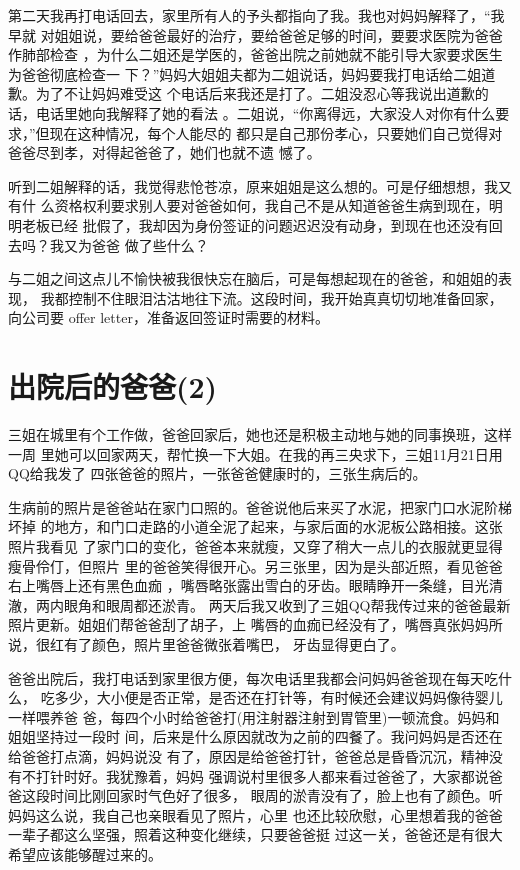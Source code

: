 \documentclass[12pt]{book}
\begin{document}
第二天我再打电话回去，家里所有人的予头都指向了我。我也对妈妈解释了，“我早就
对姐姐说，要给爸爸最好的治疗，要给爸爸足够的时间，要要求医院为爸爸作肺部检查
，为什么二姐还是学医的，爸爸出院之前她就不能引导大家要求医生为爸爸彻底检查一
下？”妈妈大姐姐夫都为二姐说话，妈妈要我打电话给二姐道歉。为了不让妈妈难受这
个电话后来我还是打了。二姐没忍心等我说出道歉的话，电话里她向我解释了她的看法
。二姐说，“你离得远，大家没人对你有什么要求，”但现在这种情况，每个人能尽的
都只是自己那份孝心，只要她们自己觉得对爸爸尽到孝，对得起爸爸了，她们也就不遗
憾了。

听到二姐解释的话，我觉得悲怆苍凉，原来姐姐是这么想的。可是仔细想想，我又有什
么资格权利要求别人要对爸爸如何，我自己不是从知道爸爸生病到现在，明明老板已经
批假了，我却因为身份签证的问题迟迟没有动身，到现在也还没有回去吗？我又为爸爸
做了些什么？

与二姐之间这点儿不愉快被我很快忘在脑后，可是每想起现在的爸爸，和姐姐的表现，
我都控制不住眼泪沽沽地往下流。这段时间，我开始真真切切地准备回家，向公司要
offer letter，准备返回签证时需要的材料。
\section{出院后的爸爸(2)}
\label{sec-9-15}

三姐在城里有个工作做，爸爸回家后，她也还是积极主动地与她的同事换班，这样一周
里她可以回家两天，帮忙换一下大姐。在我的再三央求下，三姐11月21日用QQ给我发了
四张爸爸的照片，一张爸爸健康时的，三张生病后的。

生病前的照片是爸爸站在家门口照的。爸爸说他后来买了水泥，把家门口水泥阶梯坏掉
的地方，和门口走路的小道全泥了起来，与家后面的水泥板公路相接。这张照片我看见
了家门口的变化，爸爸本来就瘦，又穿了稍大一点儿的衣服就更显得瘦骨伶仃，但照片
里的爸爸笑得很开心。另三张里，因为是头部近照，看见爸爸右上嘴唇上还有黑色血痂
，嘴唇略张露出雪白的牙齿。眼睛睁开一条缝，目光清澈，两内眼角和眼周都还淤青。
两天后我又收到了三姐QQ帮我传过来的爸爸最新照片更新。姐姐们帮爸爸刮了胡子，上
嘴唇的血痂已经没有了，嘴唇真张妈妈所说，很红有了颜色，照片里爸爸微张着嘴巴，
牙齿显得更白了。

爸爸出院后，我打电话到家里很方便，每次电话里我都会问妈妈爸爸现在每天吃什么，
吃多少，大小便是否正常，是否还在打针等，有时候还会建议妈妈像待婴儿一样喂养爸
爸，每四个小时给爸爸打(用注射器注射到胃管里)一顿流食。妈妈和姐姐坚持过一段时
间，后来是什么原因就改为之前的四餐了。我问妈妈是否还在给爸爸打点滴，妈妈说没
有了，原因是给爸爸打针，爸爸总是昏昏沉沉，精神没有不打针时好。我犹豫着，妈妈
强调说村里很多人都来看过爸爸了，大家都说爸爸这段时间比刚回家时气色好了很多，
眼周的淤青没有了，脸上也有了颜色。听妈妈这么说，我自己也亲眼看见了照片，心里
也还比较欣慰，心里想着我的爸爸一辈子都这么坚强，照着这种变化继续，只要爸爸挺
过这一关，爸爸还是有很大希望应该能够醒过来的。
\end{document}
